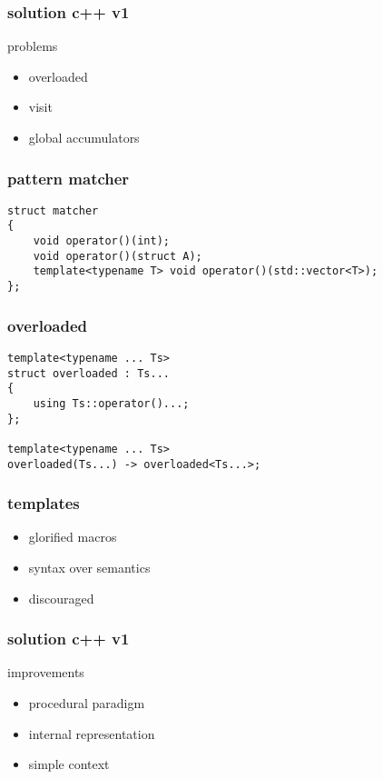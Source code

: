 \begin{frame}
    \frametitle{solution c++ v1}
    problems
    \begin{itemize}
        \item overloaded
        \item visit
        \item global accumulators
    \end{itemize}
\end{frame}

\begin{frame}[fragile]
    \frametitle{pattern matcher}
    \begin{verbatim}
struct matcher
{
    void operator()(int);
    void operator()(struct A);
    template<typename T> void operator()(std::vector<T>);
};
    \end{verbatim}
\end{frame}

\begin{frame}[fragile]
    \frametitle{overloaded}
    \begin{verbatim}
template<typename ... Ts>
struct overloaded : Ts...
{
    using Ts::operator()...;
};

template<typename ... Ts>
overloaded(Ts...) -> overloaded<Ts...>;
    \end{verbatim}
\end{frame}

\begin{frame}
    \frametitle{templates}
    \begin{itemize}
        \item glorified macros
        \item syntax over semantics
        \item discouraged
    \end{itemize}
\end{frame}

\begin{frame}
    \frametitle{solution c++ v1}
    improvements
    \begin{itemize}
        \item procedural paradigm
        \item internal representation
        \item simple context
    \end{itemize}
\end{frame}

